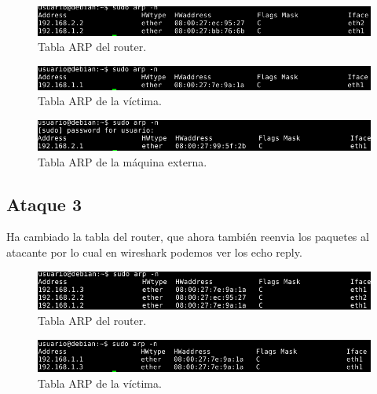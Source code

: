 \documentclass[11pt]{article}
\begin{document}
      \begin{figure}[H]
        \centering
        \includegraphics[width = \textwidth]{arptable_gw2}
        \caption{Tabla ARP del router.}
      \end{figure}

      \begin{figure}[H]
        \centering
        \includegraphics[width = \textwidth]{arptable_vic2}
        \caption{Tabla ARP de la víctima.}
      \end{figure}

      \begin{figure}[H]
        \centering
        \includegraphics[width = \textwidth]{arptable_ex2}
        \caption{Tabla ARP de la máquina externa.}
      \end{figure}

    \subsection{Ataque 3}
      \par
      Ha cambiado la tabla del router, que ahora también reenvia los paquetes al
      atacante por lo cual en wireshark podemos ver los echo reply.

      \begin{figure}[H]
        \centering
        \includegraphics[width = \textwidth]{at_gw3}
        \caption{Tabla ARP del router.}
      \end{figure}

      \begin{figure}[H]
        \centering
        \includegraphics[width = \textwidth]{at_vic3}
        \caption{Tabla ARP de la víctima.}
      \end{figure}
\end{document}
